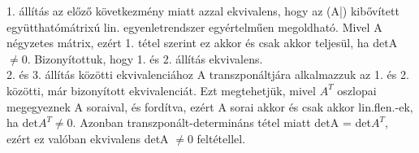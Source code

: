 \begin{bizonyitas}{}
1. állítás az előző következmény miatt azzal ekvivalens, hogy az (A|) kibővített együtthatómátrixú lin. egyenletrendszer egyértelműen megoldható. Mivel A négyzetes mátrix, ezért 1. tétel szerint ez akkor és csak akkor teljesül, ha detA $\neq 0$. Bizonyítottuk, hogy 1. és 2. állítás ekvivalens.\\
2. és 3. állítás közötti ekvivalenciához A transzponáltjára alkalmazzuk az 1. és 2. közötti, már bizonyított ekvivalenciát. Ezt megtehetjük, mivel $A^T$ oszlopai megegyeznek A soraival, és fordítva, ezért A sorai akkor és csak akkor lin.flen.-ek, ha det$A^T \neq 0$. Azonban transzponált-determináns tétel miatt detA = det$A^T$, ezért ez valóban ekvivalens detA $\neq 0$ feltétellel.
\end{bizonyitas}


